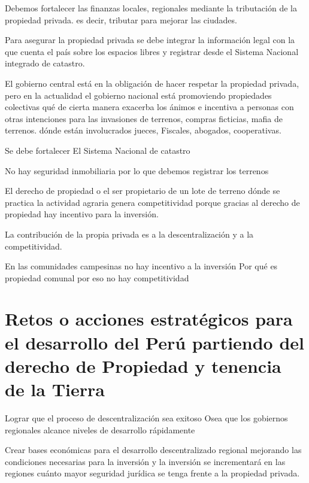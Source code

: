 \documentclass[
  letterpaper,
  DIV=11,
  numbers=noendperiod]{scrartcl}
\begin{document}
Debemos fortalecer las finanzas locales, regionales mediante la
tributación de la propiedad privada. es decir, tributar para mejorar las
ciudades.

Para asegurar la propiedad privada se debe integrar la información legal
con la que cuenta el país sobre los espacios libres y registrar desde el
Sistema Nacional integrado de catastro.

El gobierno central está en la obligación de hacer respetar la propiedad
privada, pero en la actualidad el gobierno nacional está promoviendo
propiedades colectivas qué de cierta manera exacerba los ánimos e
incentiva a personas con otras intenciones para las invasiones de
terrenos, compras ficticias, mafia de terrenos. dónde están involucrados
jueces, Fiscales, abogados, cooperativas.

Se debe fortalecer El Sistema Nacional de catastro

No hay seguridad inmobiliaria por lo que debemos registrar los terrenos

El derecho de propiedad o el ser propietario de un lote de terreno dónde
se practica la actividad agraria genera competitividad porque gracias al
derecho de propiedad hay incentivo para la inversión.

La contribución de la propia privada es a la descentralización y a la
competitividad.

En las comunidades campesinas no hay incentivo a la inversión Por qué es
propiedad comunal por eso no hay competitividad

\hypertarget{retos-o-acciones-estratuxe9gicos-para-el-desarrollo-del-peruxfa-partiendo-del-derecho-de-propiedad-y-tenencia-de-la-tierra}{%
\section{Retos o acciones estratégicos para el desarrollo del Perú
partiendo del derecho de Propiedad y tenencia de la
Tierra}\label{retos-o-acciones-estratuxe9gicos-para-el-desarrollo-del-peruxfa-partiendo-del-derecho-de-propiedad-y-tenencia-de-la-tierra}}

Lograr que el proceso de descentralización sea exitoso Osea que los
gobiernos regionales alcance niveles de desarrollo rápidamente

Crear bases económicas para el desarrollo descentralizado regional
mejorando las condiciones necesarias para la inversión y la inversión se
incrementará en las regiones cuánto mayor seguridad jurídica se tenga
frente a la propiedad privada.
\end{document}
